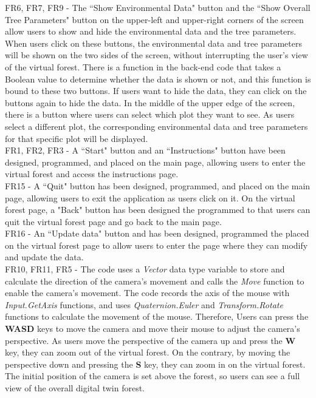 \documentclass[12pt, titlepage]{article}
\begin{document}
\noindent FR6, FR7, FR9 - The ``Show Environmental Data" button and the ``Show Overall Tree
 Parameters" button on the upper-left and upper-right corners of the screen allow users to
 show and hide the environmental data and the tree parameters. When users click on these
 buttons, the environmental data and tree parameters will be shown on the two sides of the
screen, without interrupting the user's view of the virtual forest. There is a function
in the back-end code that takes a Boolean value to determine whether the data is shown
or not, and this function is bound to these two buttons. If users want to hide the data,
they can click on the buttons again to hide the data. In the middle of the upper edge of the
screen, there is a button where users can select which plot they want to see. As users select
a different plot, the corresponding environmental data and tree parameters for that specific
plot will be displayed.\\

\noindent FR1, FR2, FR3 - A ``Start" button and an ``Instructions" button have been designed,
 programmed, and placed on the main page, allowing users to enter the virtual forest and
  access the instructions page.\\

\noindent FR15 - A ``Quit" button has been designed, programmed, and placed on the main page,
allowing users to exit the application as users click on it. On the virtual forest page, a
"Back" button has been designed the programmed to that users can quit the virtual forest page
and go back to the main page.\\

\noindent FR16 - An ``Update data" button and has been designed, programmed the placed on the
virtual forest page to allow users to enter the page where they can modify and update the
data.\\

\noindent FR10, FR11, FR5 - The code uses a \textit{Vector} data type variable to store and
calculate the direction of the camera's movement and calls the \textit{Move} function to
enable the camera's movement. The code records the axis of the mouse with
 \textit{Input.GetAxis} functions, and uses \textit{Quaternion.Euler} and
 \textit{Transform.Rotate} functions to calculate the movement of the mouse. Therefore, Users
 can press the \textbf{WASD} keys to move the camera and move their mouse to adjust the
 camera's perspective. As users move the perspective of the camera up and press the \textbf{W}
key, they can zoom out of the virtual forest. On the contrary, by moving the perspective down
and pressing the \textbf{S} key, they can zoom in on the virtual forest. The initial position
of the camera is set above the forest, so users can see a full view of the overall digital
twin forest.
\end{document}
